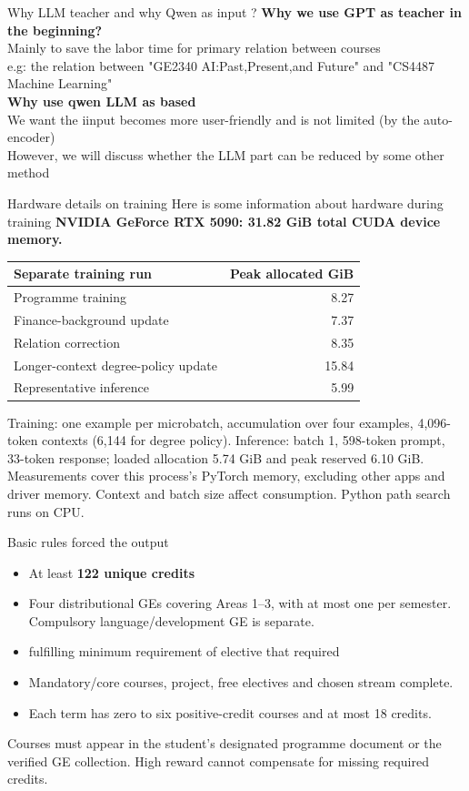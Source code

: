 \documentclass[aspectratio=169,11pt]{beamer}
\newcommand{\smallnote}[1]{\par{\footnotesize\color{muted}#1\par}}
\begin{document}
\begin{frame}{Why LLM teacher and why Qwen as input ?}
\textbf{Why we use GPT as teacher in the beginning?}\\
Mainly to save the labor time for primary relation between courses 
\\e.g: the relation between "GE2340 AI:Past,Present,and Future" and "CS4487 Machine Learning"\\
\textbf{Why use qwen LLM as based}\\
We want the iinput becomes more user-friendly and is not limited (by the auto-encoder)\\
However, we will discuss whether the LLM part can be reduced by some other method
\end{frame}
\begin{frame}{Hardware details on training}
Here is some information about hardware during training
\textbf{NVIDIA GeForce RTX 5090: 31.82 GiB total CUDA device memory.}
\vspace{1mm}
\begin{tabular}{L{9cm}r}
\toprule
Separate training run & Peak allocated GiB\\\midrule
Programme training & 8.27\\
Finance-background update & 7.37\\
Relation correction & 8.35\\
Longer-context degree-policy update & 15.84\\\midrule
Representative inference & 5.99\\
\bottomrule
\end{tabular}\par
\smallnote{Training: one example per microbatch, accumulation over four examples, 4,096-token contexts (6,144 for degree policy). Inference: batch 1, 598-token prompt, 33-token response; loaded allocation 5.74 GiB and peak reserved 6.10 GiB. Measurements cover this process's PyTorch memory, excluding other apps and driver memory. Context and batch size affect consumption. Python path search runs on CPU.}
\end{frame}
\begin{frame}{Basic rules forced the output}
\begin{itemize}\setlength{\itemsep}{5pt}
\item At least \textbf{122 unique credits}
\item Four distributional GEs covering Areas 1--3, with at most one per semester. Compulsory language/development GE is separate.
\item fulfilling minimum requirement of elective that required 
\item Mandatory/core courses, project, free electives and chosen stream complete.
\item Each term has zero to six positive-credit courses and at most 18 credits.
\end{itemize}
\smallnote{Courses must appear in the student's designated programme document or the verified GE collection. High reward cannot compensate for missing required credits.}
\end{frame}
\end{document}
